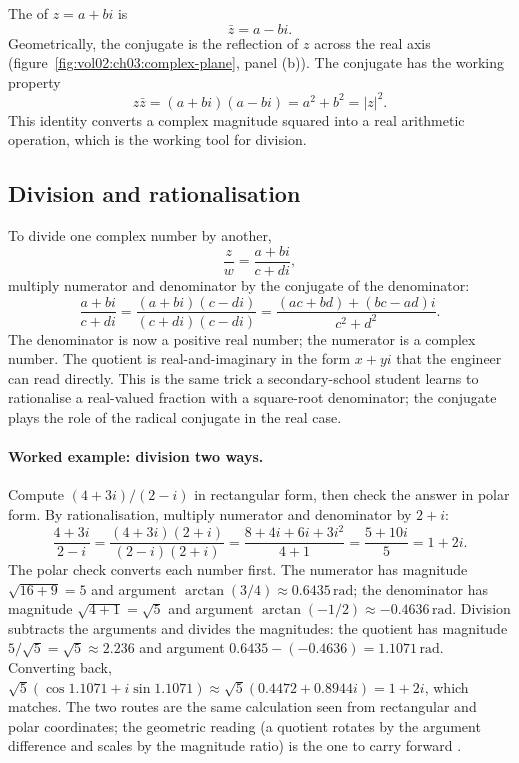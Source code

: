 

The  of $z = a + bi$ is
\[
\bar{z} = a - bi.
\]
Geometrically, the conjugate is the reflection of $z$ across the
real axis (figure~\ref{fig:vol02:ch03:complex-plane}, panel (b)). The conjugate has the working property
\[
z \bar{z} = (a + bi)(a - bi) = a^{2} + b^{2} = |z|^{2}.
\]
This identity converts a complex magnitude squared into a real
arithmetic operation, which is the working tool for division.

\subsection{Division and rationalisation}

To divide one complex number by another,
\[
\frac{z}{w} = \frac{a + bi}{c + di},
\]
multiply numerator and denominator by the conjugate of the
denominator:
\[
\frac{a + bi}{c + di} = \frac{(a + bi)(c - di)}{(c + di)(c - di)} = \frac{(ac + bd) + (bc - ad)i}{c^{2} + d^{2}}.
\]
The denominator is now a positive real number; the numerator is a
complex number. The quotient is real-and-imaginary in the form
$x + yi$ that the engineer can read directly. This is the same
trick a secondary-school student learns to rationalise a real-valued
fraction with a square-root denominator; the conjugate plays the
role of the radical conjugate in the real case.

\paragraph{Worked example: division two ways.} Compute $(4 + 3i)/(2
- i)$ in rectangular form, then check the answer in polar form. By
rationalisation, multiply numerator and denominator by $2 + i$:
\[
\frac{4 + 3i}{2 - i} = \frac{(4 + 3i)(2 + i)}{(2 - i)(2 + i)}
= \frac{8 + 4i + 6i + 3i^{2}}{4 + 1}
= \frac{5 + 10i}{5} = 1 + 2i.
\]
The polar check converts each number first. The numerator has
magnitude $\sqrt{16 + 9} = 5$ and argument $\arctan(3/4) \approx
0.6435\,\text{rad}$; the denominator has magnitude $\sqrt{4 + 1} =
\sqrt{5}$ and argument $\arctan(-1/2) \approx -0.4636\,\text{rad}$.
Division subtracts the arguments and divides the magnitudes:
the quotient has magnitude $5/\sqrt{5} = \sqrt{5} \approx 2.236$ and
argument $0.6435 - (-0.4636) = 1.1071\,\text{rad}$. Converting back,
$\sqrt{5}(\cos 1.1071 + i\sin 1.1071) \approx \sqrt{5}(0.4472 +
0.8944 i) = 1 + 2i$, which matches. The two routes are the same
calculation seen from rectangular and polar coordinates; the
geometric reading (a quotient rotates by the argument difference and
scales by the magnitude ratio) is the one to carry forward
\cite[chapter 1]{text:v2ch03-needham-visual-complex}.

